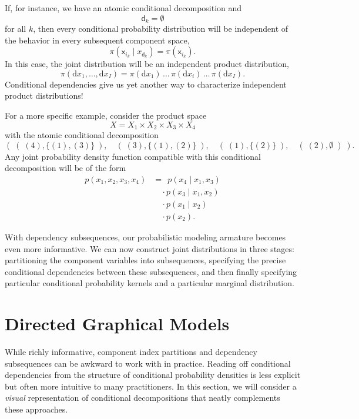 \documentclass[
  letterpaper,
  DIV=11,
  numbers=noendperiod]{scrartcl}
\begin{document}
If, for instance, we have an atomic conditional decomposition and \[
\mathsf{d}_{k} = \emptyset
\] for all \(k\), then every conditional probability distribution will
be independent of the behavior in every subsequent component space, \[
\pi( \mathsf{x}_{ i_{k} } \mid x_{ \mathsf{d}_{k} } )
=
\pi( \mathsf{x}_{ i_{k} } ).
\] In this case, the joint distribution will be an independent product
distribution, \[
\pi( \mathrm{d} x_{1}, \ldots, \mathrm{d} x_{I} )
=
\pi( \mathrm{d} x_{1} ) \,
\ldots \,
\pi( \mathrm{d} x_{i}  ) \,
\ldots \,
\pi( \mathrm{d} x_{I} ).
\] Conditional dependencies give us yet another way to characterize
independent product distributions!

For a more specific example, consider the product space \[
X = X_{1} \times X_{2} \times X_{3} \times X_{4}
\] with the atomic conditional decomposition \[
( \;
  ( \; ( 4 ), \{ (1), (3) \} \; ),  \quad
  ( \; ( 3 ), \{ (1), (2) \} \; ),  \quad
  ( \; ( 1 ), \{ (2)      \} \; ),  \quad
  ( \; ( 2 ), \emptyset      \; )
\; ).
\] Any joint probability density function compatible with this
conditional decomposition will be of the form \begin{align*}
p( x_{1}, x_{2}, x_{3}, x_{4} )
&= \;\,
p( x_{4} \mid x_{1}, x_{3} )
\\
&\quad \cdot
p( x_{3} \mid x_{1}, x_{2} )
\\
&\quad \cdot
p( x_{1} \mid x_{2} )
\\
&\quad \cdot
p( x_{2} ).
\end{align*}

With dependency subsequences, our probabilistic modeling armature
becomes even more informative. We can now construct joint distributions
in three stages: partitioning the component variables into subsequences,
specifying the precise conditional dependencies between these
subsequences, and then finally specifying particular conditional
probability kernels and a particular marginal distribution.

\section{Directed Graphical Models}\label{directed-graphical-models}

While richly informative, component index partitions and dependency
subsequences can be awkward to work with in practice. Reading off
conditional dependencies from the structure of conditional probability
densities is less explicit but often more intuitive to many
practitioners. In this section, we will consider a \emph{visual}
representation of conditional decompositions that neatly complements
these approaches.
\end{document}
